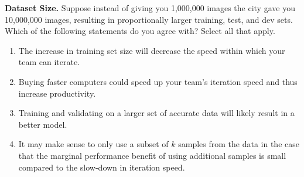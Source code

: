 \item{}
\textbf{Dataset Size.}
Suppose instead of giving you 1,000,000 images the city gave you 10,000,000 images, resulting in proportionally larger training, test, and dev sets. Which of the following statements do you agree with? Select all that apply.

\begin{enumerate}[label=(\alph*)]
    \item The increase in training set size will decrease the speed within which your team can iterate.
    \item Buying faster computers could speed up your team’s iteration speed and thus increase productivity.
    \item Training and validating on a larger set of accurate data will likely result in a better model.
    \item It may make sense to only use a subset of $k$ samples from the data in the case that the marginal performance benefit of using additional samples is small compared to the slow-down in iteration speed.
\end{enumerate} 
